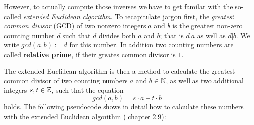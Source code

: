 However, to actually compute those inverses we have to get familar with the so-called \textit{extended Euclidean algorithm}. To recapitulate jargon first, the \textit{greatest common divisor} (GCD) of two nonzero integers $a$ and $b$ is the greatest non-zero counting number $d$ such that $d$ divides both $a$ and $b$; that is $d|a$ as well as $d|b$. We write $ gcd (a, b):=d $ for this number. In addition two counting numbers are called \textbf{relative prime}, if their greates common divisor is $1$.

The extended Euclidean algorithm is then a method to calculate the greatest common divisor of two counting numbers $ a $ and $ b \in \mathbb{N} $, as well as two additional integers $ s, t \in \mathbb{Z} $, such that the equation
\begin{equation}
\label{eq: erw_Eukl_algo}
gcd (a, b) = s \cdot a + t \cdot b
\end{equation}
holds. The following pseudocode shows in detail how to calculate these numbers with the extended Euclidean algorithm (\cite{JB} chapter 2.9):

